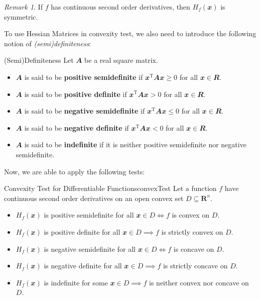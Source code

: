 \documentclass[math, code]{amznotes}
\theoremstyle{remark}
\newtheorem*{remark}{Remark}
\begin{document}
\begin{notebox}
    \begin{remark}
        If $f$ has continuous second order derivatives, then $H_f(\mathbfit{x})$ is symmetric.
    \end{remark}
\end{notebox}
To use Hessian Matrices in convexity test, we also need to introduce the following notion of \textit{(semi)definiteness}:
\begin{dfnbox}{(Semi)Definiteness}
    Let $\mathbfit{A}$ be a real square matrix.
    \begin{itemize}
        \item $\mathbfit{A}$ is said to be {\color{red} \textbf{positive semidefinite}} if $\mathbfit{x}^{\mathrm{T}}\mathbfit{Ax} \geq 0$ for all $\mathbfit{x} \in \mathbfit{R}$.
        \item $\mathbfit{A}$ is said to be {\color{red} \textbf{positive definite}} if $\mathbfit{x}^{\mathrm{T}}\mathbfit{Ax} > 0$ for all $\mathbfit{x} \in \mathbfit{R}$.
        \item $\mathbfit{A}$ is said to be {\color{red} \textbf{negative semidefinite}} if $\mathbfit{x}^{\mathrm{T}}\mathbfit{Ax} \leq 0$ for all $\mathbfit{x} \in \mathbfit{R}$.
        \item $\mathbfit{A}$ is said to be {\color{red} \textbf{negative definite}} if $\mathbfit{x}^{\mathrm{T}}\mathbfit{Ax} < 0$ for all $\mathbfit{x} \in \mathbfit{R}$.
        \item $\mathbfit{A}$ is said to be {\color{red} \textbf{indefinite}} if it is neither positive semidefinite nor negative semidefinite.
    \end{itemize}
\end{dfnbox}
Now, we are able to apply the following tests:
\begin{thmbox}{Convexity Test for Differentiable Functions}{convexTest}
    Let a function $f$ have continuous second order derivatives on an open convex set $D \subseteq \mathbf{R}^n$.
    \begin{itemize}
        \item $H_f(\mathbfit{x})$ is positive semidefinite for all $\mathbfit{x} \in D \iff f$ is convex on $D$.
        \item $H_f(\mathbfit{x})$ is positive definite for all $\mathbfit{x} \in D \implies f$ is strictly convex on $D$.
        \item $H_f(\mathbfit{x})$ is negative semidefinite for all $\mathbfit{x} \in D \iff f$ is concave on $D$.
        \item $H_f(\mathbfit{x})$ is negative definite for all $\mathbfit{x} \in D \implies f$ is strictly concave on $D$.
        \item $H_f(\mathbfit{x})$ is indefinite for some $\mathbfit{x} \in D \implies f$ is neither convex nor concave on $D$.
    \end{itemize}
\end{thmbox}
\end{document}
